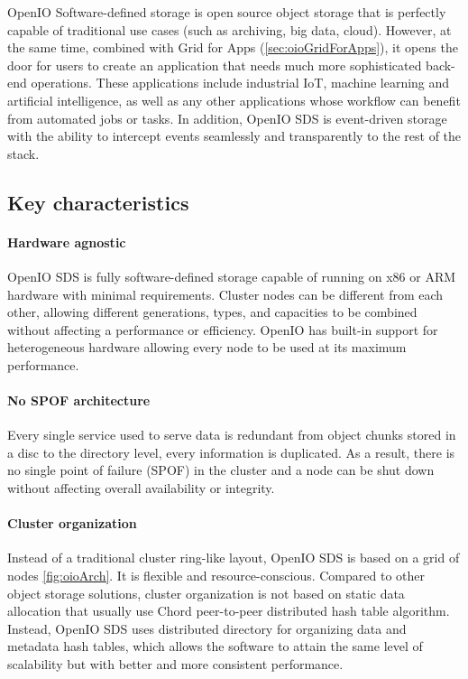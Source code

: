     OpenIO Software-defined storage is open source object storage that is perfectly capable of traditional use cases (such as archiving, big data, cloud). However, at the same time, combined with Grid for Apps (\ref{sec:oioGridForApps}), it opens the door for users to create an application that needs much more sophisticated back-end operations. These applications include industrial IoT, machine learning and artificial intelligence, as well as any other applications whose workflow can benefit from automated jobs or tasks\cite{oioNextGen}. In addition, OpenIO SDS is event-driven storage with the ability to intercept events seamlessly and transparently to the rest of the stack.

    \subsection{Key characteristics}
    \paragraph{Hardware agnostic}
    OpenIO SDS is fully software-defined storage capable of running on x86 or ARM hardware with minimal requirements. Cluster nodes can be different from each other, allowing different generations, types, and capacities to be combined without affecting a performance or efficiency\cite{oioKeyChars}.
    OpenIO has built-in support for heterogeneous hardware allowing every node to be used at its maximum performance.
    \paragraph{No SPOF architecture}
    Every single service used to serve data is redundant from object chunks stored in a disc to the directory level, every information is duplicated. As a result, there is no single point of failure (SPOF) in the cluster and a node can be shut down without affecting overall availability or integrity\cite{oioCoreSolution}.
    \paragraph{Cluster organization}
    Instead of a traditional cluster ring-like layout, OpenIO SDS is based on a grid of nodes \ref{fig:oioArch}. It is flexible and resource-conscious. Compared to other object storage solutions, cluster organization is not based on static data allocation that usually use Chord peer-to-peer distributed hash table algorithm. Instead, OpenIO SDS uses distributed directory for organizing data and metadata hash tables, which allows the software to attain the same level of scalability but with better and more consistent performance\cite{oioKeyChars}.

